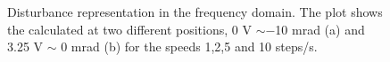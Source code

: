\begin{figure}[h!]
  \centering %
  \qquad
  \caption{\label{fig:fft0_3} Disturbance representation in the frequency domain. The plot shows the calculated \abbrFFT at two different positions, 0 V $\sim -$10 mrad (a) and 3.25 V $\sim$ 0 mrad (b) for the speeds 1,2,5 and 10 steps/s.}
\end{figure}

